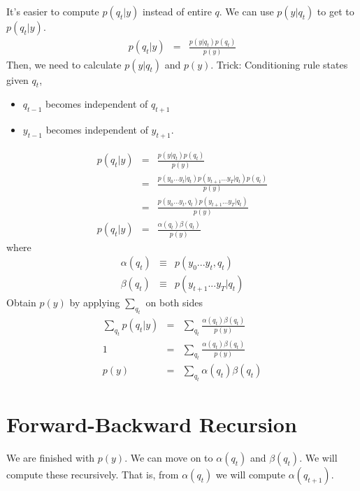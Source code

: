 It's easier to compute $p(q_t|y)$ instead of entire $q$. We can use $p(y|q_t)$
to get to $p(q_t|y)$.
\begin{eqnarray*}
p(q_t|y) &=& \frac{p(y|q_t) p(q_t)}{p(y)}
\end{eqnarray*}
Then, we need to calculate $p(y|q_t)$ and $p(y)$. Trick: Conditioning rule
states given $q_t$,
\begin{itemize}
   \item $q_{t-1}$ becomes independent of $q_{t+1}$
   \item $y_{t-1}$ becomes independent of $y_{t+1}$.
\end{itemize}



\begin{eqnarray*}
p(q_t|y) &=& \frac{p(y|q_t) p(q_t)}{p(y)}\\
&=& \frac{p(y_0...y_t|q_t)p(y_{t+1}...y_T|q_t) p(q_t)}{p(y)}\\
&=& \frac{p(y_0...y_t,q_t)p(y_{t+1}...y_T|q_t)}{p(y)}\\
p(q_t|y) &=& \frac{\alpha(q_t)\beta(q_t)}{p(y)}
\end{eqnarray*}
where
\begin{eqnarray*}
\alpha(q_t) & \equiv & p(y_0...y_t,q_t) \\
\beta(q_t) & \equiv & p(y_{t+1}...y_T|q_t)
\end{eqnarray*}
Obtain $p(y)$ by applying $\sum_{q_t}$ on both sides
\begin{eqnarray*}
\sum_{q_t}p(q_t|y)  &=& \sum_{q_t} \frac{\alpha(q_t)\beta(q_t)}{p(y)} \nonumber\\
1  &=& \sum_{q_t} \frac{\alpha(q_t)\beta(q_t)}{p(y)} \nonumber\\
p(y) &=& \sum_{q_t} \alpha(q_t)\beta(q_t) \label{py}
\end{eqnarray*}

\section{Forward-Backward Recursion}

We are finished with $p(y)$. We can move on to $\alpha(q_t)$ and
$\beta(q_t)$. We will compute these recursively. That is, from $\alpha(q_t)$ we
will compute $\alpha(q_{t+1})$.

